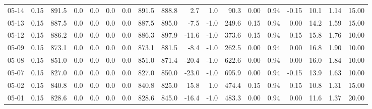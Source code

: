 \begin{threeparttable}
{\begin{tabular}{lrrrrrrrrrrrrrrrrr}
  05-14 &     0.15 & 891.5 &               0.0 &               0.0 &                0.0 &                0.0 & 891.5 & 888.8 &        2.7 &                      1.0 &                90.3 &       0.00 &      0.94 &          -0.15 &             10.1 &            1.14 &                  15.00 \\
  05-13 &     0.15 & 887.5 &               0.0 &               0.0 &                0.0 &                0.0 & 887.5 & 895.0 &       -7.5 &                     -1.0 &               249.6 &       0.15 &      0.94 &           0.00 &             14.2 &            1.59 &                  15.00 \\
  05-12 &     0.15 & 886.2 &               0.0 &               0.0 &                0.0 &                0.0 & 886.3 & 897.9 &      -11.6 &                     -1.0 &               373.6 &       0.15 &      0.94 &           0.15 &             15.8 &            1.76 &                  10.00 \\
  05-09 &     0.15 & 873.1 &               0.0 &               0.0 &                0.0 &                0.0 & 873.1 & 881.5 &       -8.4 &                     -1.0 &               262.5 &       0.00 &      0.94 &           0.00 &             16.8 &            1.90 &                  10.00 \\
  05-08 &     0.15 & 851.0 &               0.0 &               0.0 &                0.0 &                0.0 & 851.0 & 871.4 &      -20.4 &                     -1.0 &               622.6 &       0.00 &      0.94 &           0.00 &             16.0 &            1.84 &                  10.00 \\
  05-07 &     0.15 & 827.0 &               0.0 &               0.0 &                0.0 &                0.0 & 827.0 & 850.0 &      -23.0 &                     -1.0 &               695.9 &       0.00 &      0.94 &          -0.15 &             13.9 &            1.63 &                  10.00 \\
  05-02 &     0.15 & 840.8 &               0.0 &               0.0 &                0.0 &                0.0 & 840.8 & 825.0 &       15.8 &                      1.0 &               474.4 &       0.15 &      0.94 &           0.15 &             10.8 &            1.31 &                  15.00 \\
  05-01 &     0.15 & 828.6 &               0.0 &               0.0 &                0.0 &                0.0 & 828.6 & 845.0 &      -16.4 &                     -1.0 &               483.3 &       0.00 &      0.94 &           0.00 &             11.6 &            1.37 &                  20.00 \\

\end{tabular}}
\end{threeparttable}
